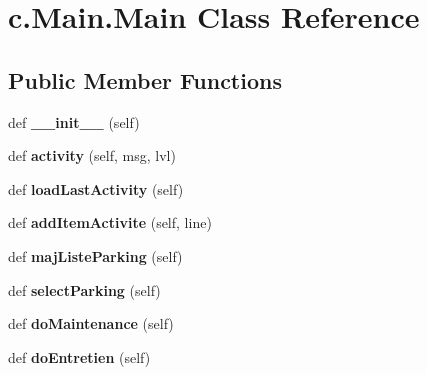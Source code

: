 \hypertarget{classc_1_1_main_1_1_main}{}\section{c.\+Main.\+Main Class Reference}
\label{classc_1_1_main_1_1_main}
\subsection*{Public Member Functions}
\begin{DoxyCompactItemize}
\item 
\hypertarget{classc_1_1_main_1_1_main_a1dabfa185197c6307859d3d632a5a276}{}def {\bfseries \+\_\+\+\_\+init\+\_\+\+\_\+} (self)\label{classc_1_1_main_1_1_main_a1dabfa185197c6307859d3d632a5a276}

\item 
\hypertarget{classc_1_1_main_1_1_main_ad056a6b890e499a532fe05128dcb7aed}{}def {\bfseries activity} (self, msg, lvl)\label{classc_1_1_main_1_1_main_ad056a6b890e499a532fe05128dcb7aed}

\item 
\hypertarget{classc_1_1_main_1_1_main_aa0fa0a998f9a8060927bb6c2364b2cf8}{}def {\bfseries load\+Last\+Activity} (self)\label{classc_1_1_main_1_1_main_aa0fa0a998f9a8060927bb6c2364b2cf8}

\item 
\hypertarget{classc_1_1_main_1_1_main_a0539a148e63240cfe0d48bb5fbfe8f5b}{}def {\bfseries add\+Item\+Activite} (self, line)\label{classc_1_1_main_1_1_main_a0539a148e63240cfe0d48bb5fbfe8f5b}

\item 
\hypertarget{classc_1_1_main_1_1_main_ae37bdebfa3240d9ba9c5916220210f91}{}def {\bfseries maj\+Liste\+Parking} (self)\label{classc_1_1_main_1_1_main_ae37bdebfa3240d9ba9c5916220210f91}

\item 
\hypertarget{classc_1_1_main_1_1_main_a8da10a12ca41fd74d73b8f70a20657fd}{}def {\bfseries select\+Parking} (self)\label{classc_1_1_main_1_1_main_a8da10a12ca41fd74d73b8f70a20657fd}

\item 
\hypertarget{classc_1_1_main_1_1_main_ab92fbf82a86c553ac62020501293cc4a}{}def {\bfseries do\+Maintenance} (self)\label{classc_1_1_main_1_1_main_ab92fbf82a86c553ac62020501293cc4a}

\item 
\hypertarget{classc_1_1_main_1_1_main_a32b8153c5f4126f78519d8d884d0255c}{}def {\bfseries do\+Entretien} (self)\label{classc_1_1_main_1_1_main_a32b8153c5f4126f78519d8d884d0255c}


\end{DoxyCompactItemize}
